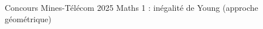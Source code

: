 \documentclass[preview]{standalone}
\begin{document}
\begin{center}
Concours Mines-Télécom 2025 Maths 1 : inégalité de Young (approche géométrique)
\end{center}
\end{document}
